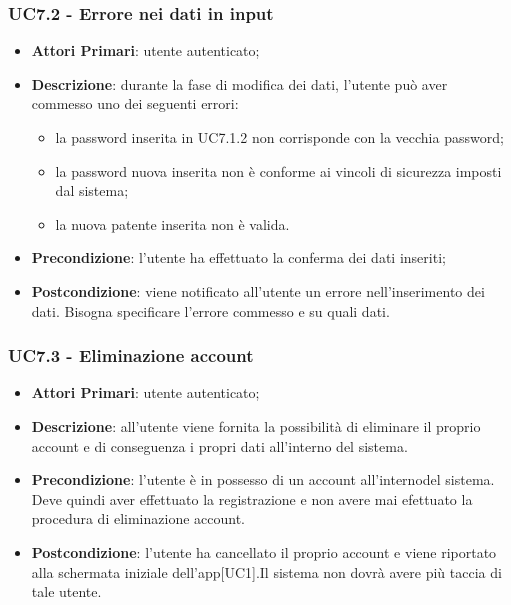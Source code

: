 \subsubsection{UC7.2 - Errore nei dati in input}
\begin{itemize}
	\item \textbf{Attori Primari}: utente autenticato;
	\item \textbf{Descrizione}: durante la fase di modifica dei dati, l'utente può aver commesso uno dei seguenti errori:
	\begin{itemize}[label=$-$]
	\item la password inserita in UC7.1.2 non corrisponde con la vecchia password;
	\item la password nuova inserita non è conforme ai vincoli di sicurezza imposti dal sistema;
	\item la nuova patente inserita non è valida.	
	\end{itemize}
	\item \textbf{Precondizione}: l'utente ha effettuato la conferma dei dati inseriti;
	\item \textbf{Postcondizione}: viene notificato all'utente un errore nell'inserimento dei dati. Bisogna specificare l'errore commesso e su quali dati.
\end{itemize}

\subsubsection{UC7.3 - Eliminazione account}
\begin{itemize}
	\item \textbf{Attori Primari}: utente autenticato;
	\item \textbf{Descrizione}: all'utente viene fornita la possibilità di eliminare il proprio account e di conseguenza i propri dati all'interno del sistema.
	\item \textbf{Precondizione}: l'utente è in possesso di un account all'internodel sistema. Deve quindi aver effettuato la registrazione e non avere mai efettuato la procedura di eliminazione account.
	\item \textbf{Postcondizione}: l'utente ha cancellato il proprio account e viene riportato alla schermata iniziale dell'app[UC1].Il sistema non dovrà avere più taccia di tale utente.
\end{itemize}









